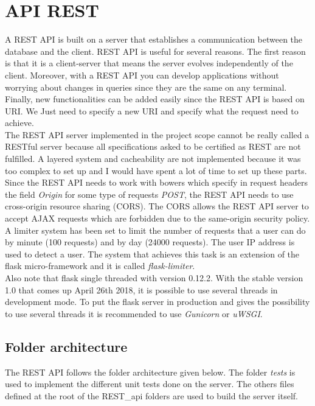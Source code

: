 \section{API REST}
A REST API is built on a server that establishes a communication between the database and the client. REST API is useful for several reasons. The first reason is that it is a client-server that means the server evolves independently of the client. Moreover, with a REST API you can develop applications without worrying about changes in queries since they are the same on any terminal. Finally, new functionalities can be added easily since the REST API is based on URI. We Just need to specify a new URI and specify what the request need to achieve.\\

The REST API server implemented in the project scope cannot be really called a RESTful server because all specifications asked to be certified as REST are not fulfilled. A layered system and cacheability are not implemented because it was too complex to set up and I would have spent a lot of time to set up these parts.\\

Since the REST API needs to work with bowers which specify in request headers the field \textit{Origin} for some type of requests \textit{POST}, the REST API needs to use cross-origin resource sharing (CORS). The CORS allows the REST API server to accept AJAX requests which are forbidden due to the same-origin security policy.\\

A limiter system has been set to limit the number of requests that a user can do by minute (100 requests) and by day (24000 requests). The user IP address is used to detect a user. The system that achieves this task is an extension of the flask micro-framework and it is called \textit{flask-limiter}.\\

Also note that flask single threaded with version 0.12.2. With the stable version 1.0 that comes up April 26th 2018, it is possible to use several threads in development mode. To put the flask server in production and gives the possibility to use several threads it is recommended to use \textit{Gunicorn} or \textit{uWSGI}.
\subsection{Folder architecture}
The REST API follows the folder architecture given below. The folder \textit{tests} is used to implement the different unit tests done on the server. The others files defined at the root of the REST\_api folders are used to build the server itself.

